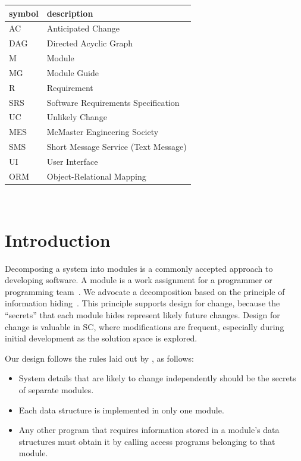 \documentclass[12pt, titlepage]{article}
\begin{document}
\renewcommand{\arraystretch}{1.2}
\begin{tabular}{l l} 
  \toprule		
  \textbf{symbol} & \textbf{description}\\
  \midrule 
  AC & Anticipated Change\\
  DAG & Directed Acyclic Graph \\
  M & Module \\
  MG & Module Guide \\
  R & Requirement\\
  SRS & Software Requirements Specification\\
  UC & Unlikely Change \\
  MES & McMaster Engineering Society \\
  SMS & Short Message Service (Text Message) \\
  UI & User Interface \\
  ORM & Object-Relational Mapping \\
  \bottomrule
\end{tabular}\\

\newpage

\tableofcontents

\listoftables

\listoffigures

\newpage


\section{Introduction}

Decomposing a system into modules is a commonly accepted approach to developing
software.  A module is a work assignment for a programmer or programming
team~\citep{ParnasEtAl1984}.  We advocate a decomposition
based on the principle of information hiding~\citep{Parnas1972a}.  This
principle supports design for change, because the ``secrets'' that each module
hides represent likely future changes.  Design for change is valuable in SC,
where modifications are frequent, especially during initial development as the
solution space is explored.  

Our design follows the rules laid out by \citet{ParnasEtAl1984}, as follows:
\begin{itemize}
\item System details that are likely to change independently should be the
  secrets of separate modules.
\item Each data structure is implemented in only one module.
\item Any other program that requires information stored in a module's data
  structures must obtain it by calling access programs belonging to that module.
\end{itemize}
\end{document}
